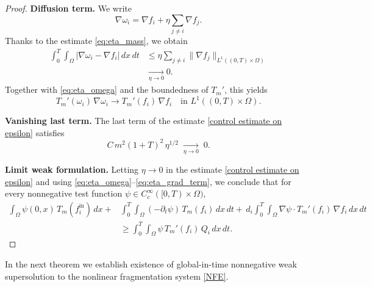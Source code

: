 \documentclass[a4paper,12pt,reqno]{amsart}
\theoremstyle{plain}
\numberwithin{equation}{section}
\begin{document}
\begin{proof}
		\medskip
		
		\noindent\textbf{Diffusion term.}
		We write
		\[
		\nabla \omega_i
		=
		\nabla f_i + \eta \sum_{j\neq i} \nabla f_j.
		\]
		Thanks to the estimate \eqref{eq:eta_mass}, we obtain
		\begin{align*}
			\int_0^T\!\!\int_\Omega
			\left|
			\nabla \omega_i - \nabla f_i
			\right|
			\,dx\,dt
			&\le
			\eta \sum_{j\neq i}
			\| \nabla f_j \|_{L^1((0,T)\times\Omega)}
			\\
			&\xrightarrow[\eta\to0]{} 0.
		\end{align*}
		Together with \eqref{eq:eta_omega} and the boundedness of $T_m'$, this yields
		\begin{equation}\label{eq:eta_grad_term}
			T_m'(\omega_i)\,\nabla \omega_i
			\longrightarrow
			T_m'(f_i)\,\nabla f_i
			\quad\text{in }L^1((0,T)\times\Omega).
		\end{equation}
		
		\medskip
		
		\noindent\textbf{Vanishing last term.}
		The last term of the estimate \eqref{control estimate on epsilon} satisfies
		\[
		C\,m^2(1+T)^2\,\eta^{1/2}
		\;\xrightarrow[\eta\to0]{}\;0.
		\]
		
		\medskip
		
		\noindent\textbf{Limit weak formulation.}
		Letting $\eta \to 0$ in the estimate \eqref{control estimate on epsilon} and using
		\eqref{eq:eta_omega}–\eqref{eq:eta_grad_term}, we conclude that for every
		nonnegative test function $\psi \in C_c^\infty([0,T)\times\Omega)$,
		\begin{align*}
			\int_\Omega \psi(0,x)\,T_m(f_i^{\mathrm{in}})\,dx
			+&
			\int_0^T\!\!\int_\Omega
			(-\partial_t\psi)\,T_m(f_i)\,dx\,dt
			+\, d_i \int_0^T\!\!\int_\Omega
			\nabla\psi \cdot  T_m'(f_i)\,\nabla f_i
			\,dx\,dt
			\\
			&\ge
			\int_0^T\!\!\int_\Omega
			\psi\,T_m'(f_i)\,Q_i
			\,dx\,dt.
		\end{align*}
	\end{proof}
	In the next theorem we establish existence of global-in-time nonnegative weak supersolution to the nonlinear fragmentation system \eqref{NFE}.
	
\end{document}
